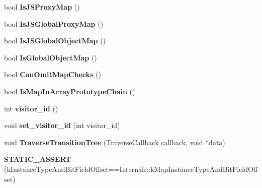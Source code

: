 \begin{DoxyCompactItemize}
\item 
\hypertarget{classv8_1_1internal_1_1_map_a6348b9a223c6cad6a8ac4b7887e073d0}{}bool {\bfseries Is\+J\+S\+Proxy\+Map} ()\label{classv8_1_1internal_1_1_map_a6348b9a223c6cad6a8ac4b7887e073d0}

\item 
\hypertarget{classv8_1_1internal_1_1_map_a17bbd91ede41548d2418f51ba2ddf900}{}bool {\bfseries Is\+J\+S\+Global\+Proxy\+Map} ()\label{classv8_1_1internal_1_1_map_a17bbd91ede41548d2418f51ba2ddf900}

\item 
\hypertarget{classv8_1_1internal_1_1_map_a70e6317deaf414c8797360244f4ea86b}{}bool {\bfseries Is\+J\+S\+Global\+Object\+Map} ()\label{classv8_1_1internal_1_1_map_a70e6317deaf414c8797360244f4ea86b}

\item 
\hypertarget{classv8_1_1internal_1_1_map_aa254813b305c4855afe90604bc93b707}{}bool {\bfseries Is\+Global\+Object\+Map} ()\label{classv8_1_1internal_1_1_map_aa254813b305c4855afe90604bc93b707}

\item 
\hypertarget{classv8_1_1internal_1_1_map_ad129229a777f330e465f827f433a204d}{}bool {\bfseries Can\+Omit\+Map\+Checks} ()\label{classv8_1_1internal_1_1_map_ad129229a777f330e465f827f433a204d}

\item 
\hypertarget{classv8_1_1internal_1_1_map_a56ada393f6ae466b85ac554cc3eadcc4}{}bool {\bfseries Is\+Map\+In\+Array\+Prototype\+Chain} ()\label{classv8_1_1internal_1_1_map_a56ada393f6ae466b85ac554cc3eadcc4}

\item 
\hypertarget{classv8_1_1internal_1_1_map_adc5ee962dbfb2b1f9acaf23c92531125}{}int {\bfseries visitor\+\_\+id} ()\label{classv8_1_1internal_1_1_map_adc5ee962dbfb2b1f9acaf23c92531125}

\item 
\hypertarget{classv8_1_1internal_1_1_map_ac7a8ebde9be73a459f9133c1ed540927}{}void {\bfseries set\+\_\+visitor\+\_\+id} (int visitor\+\_\+id)\label{classv8_1_1internal_1_1_map_ac7a8ebde9be73a459f9133c1ed540927}

\item 
\hypertarget{classv8_1_1internal_1_1_map_ab78acd45f74b0b74f2b825f8e9aa782d}{}void {\bfseries Traverse\+Transition\+Tree} (Traverse\+Callback callback, void $\ast$data)\label{classv8_1_1internal_1_1_map_ab78acd45f74b0b74f2b825f8e9aa782d}

\item 
\hypertarget{classv8_1_1internal_1_1_map_ad2c3c32a1fbd49a67e70ead082da7833}{}{\bfseries S\+T\+A\+T\+I\+C\+\_\+\+A\+S\+S\+E\+R\+T} (k\+Instance\+Type\+And\+Bit\+Field\+Offset==Internals\+::k\+Map\+Instance\+Type\+And\+Bit\+Field\+Offset)\label{classv8_1_1internal_1_1_map_ad2c3c32a1fbd49a67e70ead082da7833}


\end{DoxyCompactItemize}
